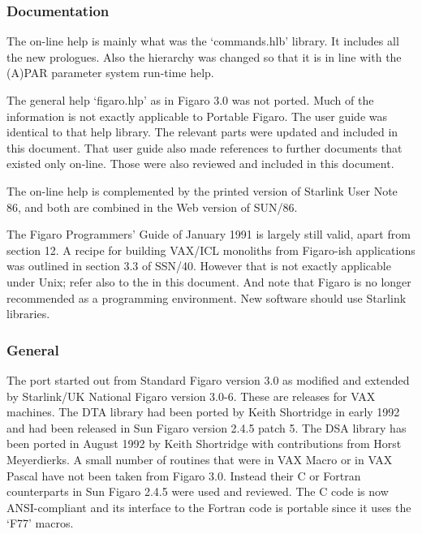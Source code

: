 
\subsubsection{\label{changessub1}Documentation}

   The on-line help is mainly what was the `commands.hlb' library. It
   includes all the new prologues. Also
   the hierarchy was changed so that it is in line with the (A)PAR
   parameter system run-time help.

   The general help `figaro.hlp' as in Figaro 3.0 was not ported. Much
   of the information is not exactly applicable to Portable Figaro. The
   user guide was identical to that help library. The relevant parts
   were updated and included in this document. That user guide also made
   references to further documents that existed only on-line. Those were
   also reviewed and included in this document.

   The on-line help is complemented by the printed version of Starlink
   User Note 86, and both are combined in the Web version of SUN/86.

   The Figaro Programmers' Guide of January 1991 is largely still
   valid, apart from section 12. A recipe for building VAX/ICL monoliths from
   Figaro-ish applications was outlined in section 3.3 of SSN/40.
   However that is not exactly applicable under Unix; refer also to
   the  in this document. And
   note that Figaro is no longer recommended as a programming
   environment. New software should use Starlink libraries.


\subsubsection{\label{changessub2}General}

   The port started out from Standard Figaro version 3.0 as modified and
   extended by Starlink/UK National Figaro version 3.0-6. These are
   releases for VAX machines. The DTA library had been ported by Keith
   Shortridge in early 1992 and had been released in Sun Figaro version
   2.4.5 patch 5. The DSA library has been ported in August 1992 by
   Keith Shortridge with contributions from Horst Meyerdierks. A small
   number of routines that were in VAX Macro or in VAX Pascal have not
   been taken from Figaro 3.0. Instead their C or Fortran counterparts
   in Sun Figaro 2.4.5 were used and reviewed. The C code is now
   ANSI-compliant and its interface to the Fortran code is portable
   since it uses the `F77' macros.

